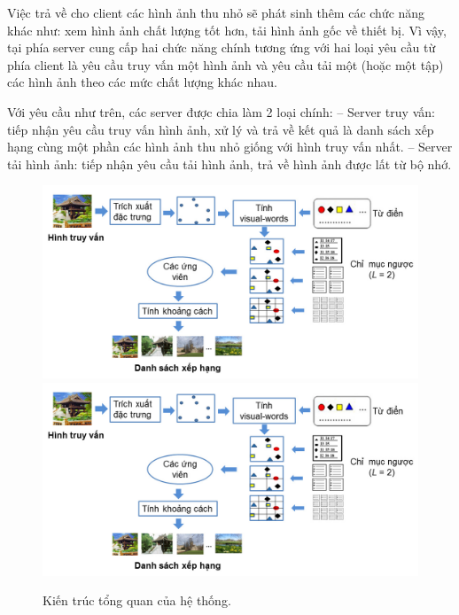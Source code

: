Việc trả về cho client các hình ảnh thu nhỏ sẽ phát sinh thêm các chức năng khác như: xem hình ảnh chất lượng tốt hơn, tải hình ảnh gốc về thiết bị. Vì vậy, tại phía server cung cấp hai chức năng chính tương ứng với hai loại yêu cầu từ phía client là yêu cầu truy vấn một hình ảnh và yêu cầu tải một (hoặc một tập) các hình ảnh theo các mức chất lượng khác nhau.

Với yêu cầu như trên, các server được chia làm 2 loại chính:
-- Server truy vấn: tiếp nhận yêu cầu truy vấn hình ảnh, xử lý và trả về kết quả là danh sách xếp hạng cùng một phần các hình ảnh thu nhỏ giống với hình truy vấn nhất.
-- Server tải hình ảnh: tiếp nhận yêu cầu tải hình ảnh, trả về hình ảnh được lất từ bộ nhớ.

\begin{figure}[!htbp]
  \begin{center}
    \leavevmode
    \ifpdf
      \includegraphics[scale=0.14]{query-process-server}
    \else
      \includegraphics[scale=0.14]{query-process-server}
    \fi
    \caption[Kiến trúc tổng quan của hệ thống]{Kiến trúc tổng quan của hệ thống.}
    \label{query-process-server}
  \end{center}
\end{figure}

